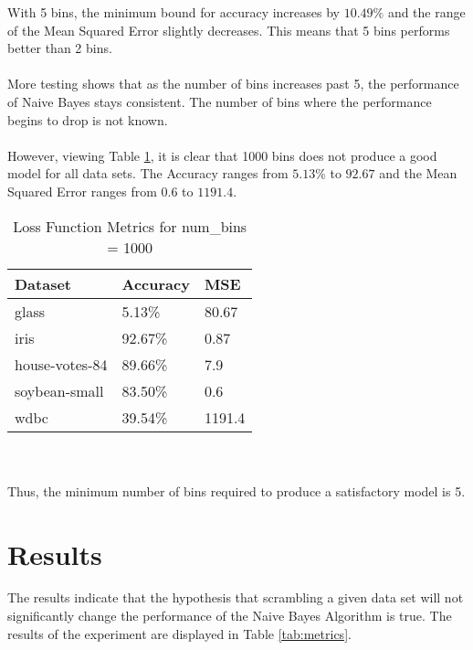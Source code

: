 \documentclass[twoside,11pt]{article}
\begin{document}
With 5 bins, the minimum bound for accuracy increases by $10.49\%$ and the range of the Mean Squared Error slightly decreases.
This means that 5 bins performs better than 2 bins. \\\\
More testing shows that as the number of bins increases past 5, the performance of Naive Bayes stays consistent. The number of bins where the performance begins to drop is not known. \\\\
However, viewing Table \ref{tab:metrics1000}, it is clear that 1000 bins does not produce a good model for all data sets.
The Accuracy ranges from $5.13\%$ to $92.67$ and the Mean Squared Error ranges from $0.6$ to $1191.4$.
\begin{table}[h]
	\centering
	\caption{Loss Function Metrics for num\_bins = 1000} \label{tab:metrics1000}
	\begin{tabular}{|l|l|l|}
		\hline
		Dataset                  & Accuracy & MSE    \\ \hline
		glass                    & 5.13\%   & 80.67  \\ \hline
		iris                     & 92.67\%  & 0.87   \\ \hline
		house-votes-84           & 89.66\%  & 7.9    \\ \hline
		soybean-small            & 83.50\%  & 0.6    \\ \hline
		wdbc                     & 39.54\%  & 1191.4 \\ \hline
	\end{tabular}
\end{table} \\\\
Thus, the minimum number of bins required to produce a satisfactory model is 5.

\section{Results}

The results indicate that the hypothesis that scrambling a given data set will not significantly change the performance of the Naive Bayes Algorithm is true.
The results of the experiment are displayed in Table \ref{tab:metrics}.
\end{document}
